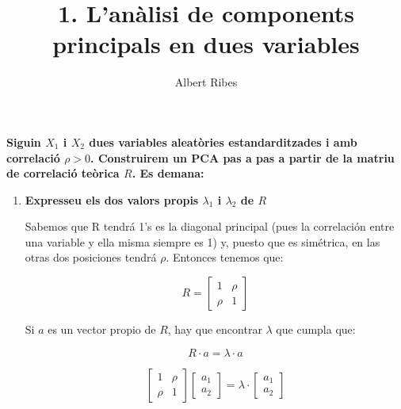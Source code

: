 \documentclass[a4paper,10pt]{article}
\title{1. L'anàlisi de components principals en dues variables}
\author{Albert Ribes}
\begin{document}
\maketitle

%


\textbf{
Siguin $X_1$ i $X_2$ dues variables aleatòries estandarditzades i amb correlació $\rho > 0$. Construirem un PCA pas a pas a partir de la matriu de correlació teòrica $R$. Es demana:
}

\begin{enumerate}
  \item \textbf{Expresseu els dos valors propis $\lambda_1$ i $  \lambda_2$ de $R$}

  Sabemos que R tendrá 1's es la diagonal principal (pues la correlación entre una variable y ella misma siempre es 1) y, puesto que es simétrica, en las otras dos posiciones tendrá $\rho$. Entonces tenemos que:

  \begin{equation*}
    R =
    \begin{bmatrix}
      1 & \rho \\
      \rho & 1
    \end{bmatrix}
  \end{equation*}

  Si $a$ es un vector propio de $R$, hay que encontrar $\lambda$ que cumpla que:

  \begin{equation*}
    R \cdot a = \lambda \cdot a
  \end{equation*}

  \begin{equation*}
    \begin{bmatrix}
      1 & \rho \\
      \rho & 1
    \end{bmatrix}
    \begin{bmatrix}
        a_1 \\
        a_2
      \end{bmatrix}
      = \lambda \cdot
      \begin{bmatrix}
          a_1 \\
          a_2
        \end{bmatrix}
  \end{equation*}


\end{enumerate}
\end{document}
